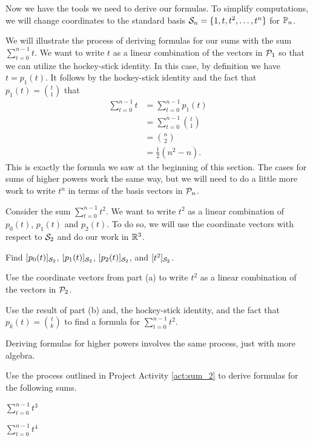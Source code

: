 Now we have the tools we need to derive our formulas. To simplify computations, we will change coordinates to the standard basis $\mathcal{S}_n = \{1, t, t^2, \ldots, t^n\}$ for $\mathbb{P}_n$. 

We will illustrate the process of deriving formulas for our sums with the sum $\sum_{t=0}^{n-1} t$. We want to write $t$ as a linear combination of the vectors in $\mathcal{P}_1$ so that we can utilize the hockey-stick identity. In this case, by definition we have $t = p_1(t)$. It follows by the hockey-stick identity and the fact that $p_1(t) = \binom{t}{1}$ that
\begin{align*}
\sum_{t=0}^{n-1} t &= \sum_{t=0}^{n-1}  p_1(t)  \\
	&= \sum_{t=0}^{n-1}  \binom{t}{1}   \\
	&= \binom{n}{2} \\
	&= \frac{1}{2}\left(n^2-n\right).
\end{align*}
This is exactly the formula we saw at the beginning of this section. The cases for sums of higher powers work the same way, but we will need to do a little more work to write $t^n$ in terms of the basis vectors in $\mathcal{P}_n$. 

\begin{pactivity} \label{act:sum_2} Consider the sum $\sum_{t=0}^{n-1} t^2$. We want to write $t^2$ as a linear combination of $p_0(t)$, $p_1(t)$ and $p_2(t)$. To do so, we will use the coordinate vectors with respect to $\mathcal{S}_2$ and do our work in $\mathbb{R}^3$. 
\ba
\item Find $[p_0(t)]_{\mathcal{S}_2}$, $[p_1(t)]_{\mathcal{S}_2}$, $[p_2(t)]_{\mathcal{S}_2}$, and $[t^2]_{\mathcal{S}_2}$.


\item Use the coordinate vectors from part (a) to write $t^2$ as a linear combination of the vectors in $\mathcal{P}_2$.


\item Use the result of part (b) and, the hockey-stick identity, and the fact that $p_k(t) = \binom{t}{k}$ to find a formula for $\sum_{t=0}^{n-1} t^2$.


\ea

\end{pactivity}

Deriving formulas for higher powers involves the same process, just with more algebra.

\begin{pactivity} \label{act:sums_higher} Use the process outlined in Project Activity \ref{act:sum_2} to derive formulas for the following sums.
\ba
\item $\sum_{t=0}^{n-1} t^3$


\item $\sum_{t=0}^{n-1} t^4$


\ea

\end{pactivity}






